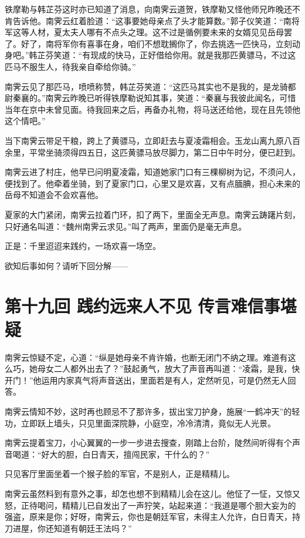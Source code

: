 \documentclass[12pt,oneside]{book}
\begin{document}
铁摩勒与韩芷芬这时亦已知道了消息，向南霁云道贺，铁摩勒又怪他师兄昨晚还不肯告诉他。南霁云红着脸道：``这事要她母亲点了头才能算数。''郭子仪笑道：``南将军这等人材，夏太夫人哪有不点头之理。这不过是循例要未来的女婿见见岳母罢了。好了，南将军你有喜事在身，咱们不想耽搁你了，你去挑选一匹快马，立刻动身吧。''韩芷芬笑道：``有现成的快马，正好借给你用。就是我那匹黄骠马，不过这匹马不服生人，待我亲自牵给你骑。''

南霁云见了那匹马，喷喷称赞，韩芷芬笑道：``这匹马其实也不是我的，是龙骑都尉秦襄的。''南霁云昨晚已听得铁摩勒说知其事，笑道：``秦襄与我彼此闻名，可惜当年在京中未曾见面。待我回来之后，再备办礼物，将马送还给他，现在且先领他这个情吧。''

当下南霁云带足干粮，跨上了黄骠马，立即赶去与夏凌霜相会。玉龙山离九原八百余里，平常坐骑须得四五日，这匹黄骠马放尽脚力，第二日中午时分，便已赶到。

南霁云进了村庄，他早已问明夏凌霜，知道她家门口有三棵柳树为记，不须问人，便找到了。他牵着坐骑，到了夏家门口，心里又是欢喜，又有点腼腆，担心未来的岳母不知道会不会欢喜他。

夏家的大门紧闭，南霁云拉着门环，扣了两下，里面全无声息。南霁云踌躇片刻，只好通名叫道：``魏州南霁云求见。''叫了两声，里面仍是毫无声息。

正是：千里迢迢来践约，一场欢喜一场空。

欲知后事如何？请听下回分解------

\chapter{第十九回 践约远来人不见
传言难信事堪疑}\label{ux7b2cux5341ux4e5dux56de-ux8df5ux7ea6ux8fdcux6765ux4ebaux4e0dux89c1-ux4f20ux8a00ux96beux4fe1ux4e8bux582aux7591}

南霁云惊疑不定，心道：``纵是她母亲不肯许婚，也断无闭门不纳之理。难道有这么巧，她母女二人都外出去了？''鼓起勇气，放大了声音再叫道：``凌霜，是我，快开门！''他运用内家真气将声音送出，里面若是有人，定然听见，可是仍然无人回答。

南霁云情知不妙，这时再也顾忌不了那许多，拔出宝刀护身，施展``一鹤冲天''的轻功，立即跃上墙头，只见里面深院静，小庭空，冷冷清清，竟似无人光景。

南霁云提着宝刀，小心翼翼的一步一步进去搜查，刚踏上台阶，陡然间听得有个声音喝道：``好大的胆，白日青天，擅闯民家，干什么的？''

只见客厅里面坐着一个猴子脸的军官，不是别人，正是精精儿。

南霁云虽然料到有意外之事，却怎也想不到精精儿会在这儿。他怔了一怔，又惊又怒，正待喝问，精精儿已自发出了一声狞笑，站起来道：``我道是哪个胆大妄为的强盗，原来是你；好呀，南霁云，你也是朝廷军官，未得主人允许，白日青天，持刀进屋，你还知道有朝廷王法吗？''
\end{document}
